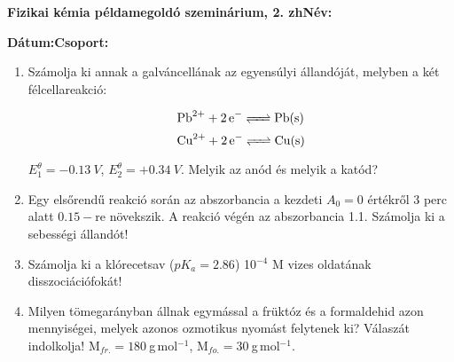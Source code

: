 \documentclass[a4paper, 11pt]{article}
\begin{document}
\textbf{Fizikai kémia példamegoldó szeminárium, 2. zh}\hfill \textbf{Név:}

\textbf{Dátum:}\hfill \textbf{Csoport:}
\thispagestyle{empty}

\begin{enumerate}

\item Számolja ki annak a galváncellának az egyensúlyi állandóját, melyben a két félcellareakció:
 
\begin{equation}
        \ce{Pb^{2+} + 2e^- <=> Pb(s)}
\end{equation}
\begin{equation}
        \ce{Cu^{2+} + 2e^- <=> Cu(s)}
\end{equation}

$E_1^\theta=-0.13~V$, $E_2^\theta=+0.34~V$. Melyik az anód és melyik a katód? 

\item Egy elsőrendű reakció során az abszorbancia a kezdeti $A_0=0$ értékről 3 perc alatt $0.15-$re növekszik. A reakció végén az abszorbancia 1.1. Számolja ki a sebességi állandót!

\item Számolja ki a klórecetsav ($pK_a=2.86$) 10$^{-4}$ M vizes oldatának disszociációfokát!  

\item Milyen tömegarányban állnak egymással a früktóz és a formaldehid azon mennyiségei, melyek azonos ozmotikus nyomást felytenek ki? Válaszát indolkolja! M$_{fr.}=180~$g$\,$mol$^{-1}$, M$_{fo.}=30~$g$\,$mol$^{-1}$.


\end{enumerate}
\end{document}
